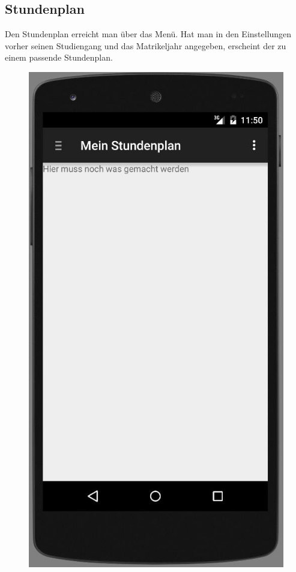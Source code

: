 \subsection{Stundenplan}

Den Stundenplan erreicht man über das Menü. Hat man in den Einstellungen vorher seinen Studiengang und das Matrikeljahr angegeben, erscheint der zu einem passende Stundenplan.

\begin{figure}[h]
	\centering
	\includegraphics[scale=0.6]{03_Bedienungsanleitung/img/stundenplan.jpg}
	\label{img:grafik-dummy}
\end{figure}

